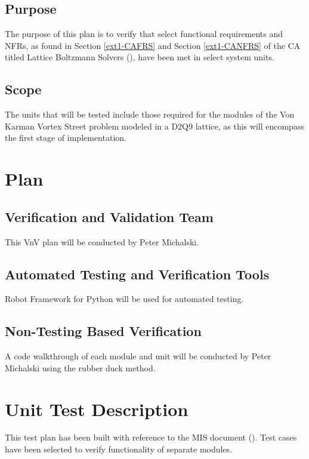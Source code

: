 \documentclass[12pt, titlepage]{article}
\begin{document}
\subsection{Purpose}
\label{purpose}

\noindent The purpose of this plan is to verify that select functional requirements and NFRs, as found in Section \ref{ext1-CAFRS} and Section \ref{ext1-CANFRS} of the CA titled Lattice Boltzmann Solvers (\citet{LBM_CA_PM}), have been met in select system units.\

\subsection{Scope}

The units that will be tested include those required for the modules of the Von Karman Vortex Street problem modeled in a D2Q9 lattice, as this will encompass the first stage of implementation.


\section{Plan}
\label{testplan}
	
\subsection{Verification and Validation Team}

This VnV plan will be conducted by Peter Michalski.

\subsection{Automated Testing and Verification Tools}

Robot Framework for Python will be used for automated testing.

\subsection{Non-Testing Based Verification}

A code walkthrough of each module and unit will be conducted by Peter Michalski using the rubber duck method.

\section{Unit Test Description}
\label{unittest}

This test plan has been built with reference to the MIS document (\citet{LBM_MIS_PM}). Test cases have been selected to verify functionality of separate modules.
\end{document}
